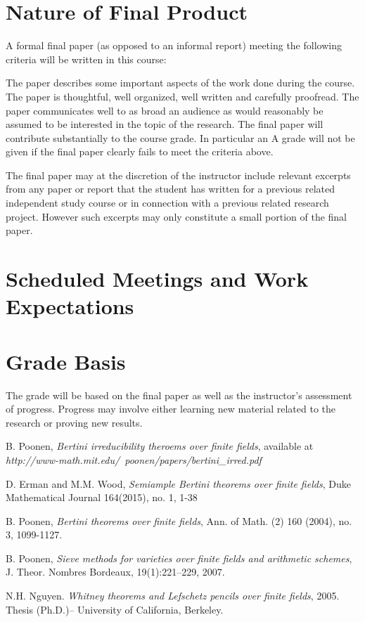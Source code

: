 \documentclass[12pt]{article}
\theoremstyle{plain}
\theoremstyle{definition}
\newcommand{\<}{\langle}
\renewcommand{\>}{\rangle}
\begin{document}
\section{Nature of Final Product}

A formal final paper (as opposed to an informal report) meeting the following criteria will be written in this course:

The paper describes some important aspects of the work done during the course.
The paper is thoughtful, well organized, well written and carefully proofread.
The paper communicates well to as broad an audience as would reasonably be assumed to be interested in the topic of the research.
The final paper will contribute substantially to the course grade. In particular an A grade will not be given if the final paper clearly fails to meet the criteria above.

The final paper may at the discretion of the instructor include relevant excerpts from any paper or report that the student has written for a previous related independent study course or in connection with a previous related research project. However such excerpts may only constitute a small portion of the final paper.

\section{Scheduled Meetings and Work Expectations}



\section{Grade Basis}
 The grade will be based on the final
paper as well as the instructor's assessment of progress.
Progress may involve either learning new material related
to the research or proving new results.


\begin{thebibliography}{9}
B. Poonen, \textit{Bertini irreducibility theroems over finite fields}, available at \textit{http://www-math.mit.edu/~poonen/papers/bertini\_irred.pdf}

D. Erman and M.M. Wood, \textit{Semiample Bertini theorems over finite fields}, Duke Mathematical Journal 164(2015), no. 1, 1-38

B. Poonen, \textit{Bertini theorems over finite fields}, Ann. of Math. (2) 160 (2004), no. 3, 1099-1127.

B. Poonen, \textit{Sieve methods for varieties over finite fields and arithmetic schemes}, J. Theor. Nombres Bordeaux, 19(1):221–229, 2007.

N.H. Nguyen. \textit{Whitney theorems and Lefschetz pencils over finite fields}, 2005. Thesis (Ph.D.)–
University of California, Berkeley.
\end{thebibliography}
\end{document}
